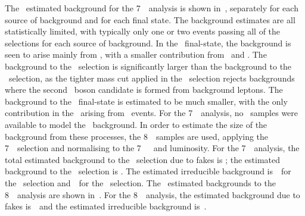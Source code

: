 The \mc\ estimated background for the 7~\tev\ analysis is shown
in~, separately for each source of background and for each final state. The
background estimates are all statistically limited, with typically only one or
two events passing all of the selections for each source of background. In the \eeee\ final-state, the
background is seen to arise mainly from \ZX, with a smaller contribution from
\WZ\ and \WW. The background to the \ZZs\ selection is significantly larger than
the background to the \ZZ\ selection, as the tighter mass cut applied in the
\ZZ\ selection rejects backgrounds where the second \Z\ boson candidate is formed from
background leptons. The background to the \mmmm\ final-state is estimated to be
much smaller, with the only contribution in the \mcsim\ arising
from \WZ\ events. For the 7~\tev\ analysis, no \mc\
samples were available to model the \trilep\ background. In order to estimate
the size of the background from these processes, the 8~\tev\ samples are used, applying the 7~\tev\
selection and normalising to the 7~\tev\ \cx\ and luminosity.
For the 7~\tev\ analysis, the total estimated background to the \ZZ\ selection due
to fakes is
\ZZSevenTeVMCBgEstRedZZLLLL; the estimated background to the \ZZs\ selection
is \ZZSevenTeVMCBgEstRedZZsLLLL. The estimated irreducible background
is~\ZZSevenTeVMCBgEstIredZZLLLL\ for the \ZZ\ selection
and~\ZZSevenTeVMCBgEstRedZZsLLLL\ for the \ZZs\ selection.
The \mc\ estimated backgrounds to the 8~\tev\ analysis are shown
in~\tab{mc-bg-eight}. For the 8~\tev\ analysis, the estimated background
due to fakes is~\ZZEightTeVMCBgEstRedZZLLLL\ and the estimated irreducible
background is~\ZZEightTeVMCBgEstIredZZLLLL. 


